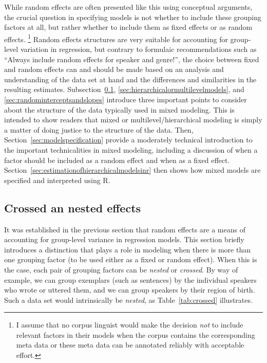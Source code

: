 \documentclass[a4paper,12pt]{article}
\begin{document}
While random effects are often presented like this using conceptual arguments, the crucial question in specifying models is not whether to include these grouping factors at all, but rather whether to include them as fixed effects or as random effects.%
\footnote{I assume that no corpus linguist would make the decision \textit{not} to include relevant factors in their models when the corpus contains the corresponding meta data or these meta data can be annotated reliably with acceptable effort.}
Random effects structures are very suitable for accounting for group-level variation in regression, but contrary to formulaic recommendations such as ``Always include random effects for speaker and genre!'', the choice between fixed and random effects can and should be made based on an analysis and understanding of the data set at hand and the differences and similarities in the resulting estimates.
Subsection~\ref{sec:crossedandnestedeffects}, \ref{sec:hierarchicalormultilevelmodels}, and \ref{sec:randominterceptsandslopes} introduce three important points to consider about the structure of the data typically used in mixed modeling.
This is intended to show readers that mixed or multilevel\slash hierarchical modeling is simply a matter of doing justice to the structure of the data.
Then, Section~\ref{sec:modelspecification} provide a moderately technical introduction to the important technicalities in mixed modeling, including a discussion of when a factor should be included as a random effect and when as a fixed effect.
Section~\ref{sec:estimationofhierarchicalmodelsinr} then shows how mixed models are specified and interpreted using R.


\subsection{Crossed an nested effects}
\label{sec:crossedandnestedeffects}

It was established in the previous section that random effects are a means of accounting for group-level variance in regression models.
This section briefly introduces a distinction that plays a role in modeling when there is more than one grouping factor (to be used either as a fixed or random effect).
When this is the case, each pair of grouping factors can be \textit{nested} or \textit{crossed}.
By way of example, we can group exemplars (such as sentences) by the individual speakers who wrote or uttered them, and we can group speakers by their region of birth.
Such a data set would intrinsically be \textit{nested}, as Table~\ref{tab:crossed} illustrates.
\end{document}
